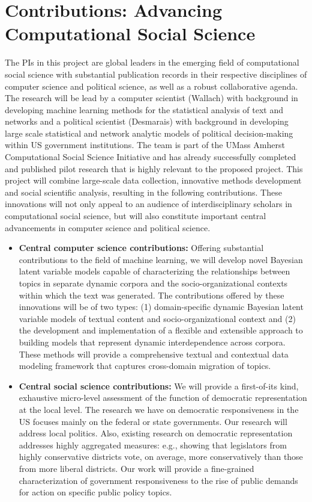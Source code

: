 \section{Contributions: Advancing Computational Social Science}

The PIs in this project are global leaders in the emerging field of computational social science with substantial publication records in their respective disciplines of computer science and political science, as well as a robust collaborative agenda. The research will be lead by a computer scientist (Wallach) with background in developing machine learning methods for the statistical analysis of text and networks and a political scientist (Desmarais) with background in developing large scale statistical and network analytic models of political decision-making within US government institutions. The team is part of the UMass Amherst Computational Social Science Initiative and has already successfully completed and published pilot research that is highly relevant to the proposed project. This project will combine large-scale data collection, innovative methods development and social scientific analysis, resulting in the following contributions. These innovations will not only appeal to an audience of interdisciplinary scholars in computational social science, but will also constitute important central advancements in computer science and political science.

\begin{itemize}
\item {\bf Central computer science contributions:} Offering substantial contributions to the field of machine learning, we will develop novel Bayesian latent variable models capable of characterizing the relationships between topics in separate dynamic corpora and the socio-organizational contexts within which the text was generated. The contributions offered by these innovations will be of two types: (1) domain-specific dynamic Bayesian latent variable models of textual content and socio-organizational context and (2) the development and implementation of a flexible and extensible approach to building models that represent dynamic interdependence across corpora. These methods will provide a comprehensive textual and contextual data modeling framework that captures cross-domain migration of topics.
\item {\bf Central social science contributions:} We will provide a first-of-its kind, exhaustive micro-level assessment of the function of  democratic representation at the local level. The research we have on democratic responsiveness in the US focuses mainly on the federal or state governments. Our research will address local politics. Also, existing research on democratic representation addresses highly aggregated measures: e.g., showing that legislators from highly conservative districts vote, on average, more conservatively than those from more liberal districts. Our work will provide a fine-grained characterization of government responsiveness to the rise of public demands for action on specific public policy topics.
\end{itemize}



